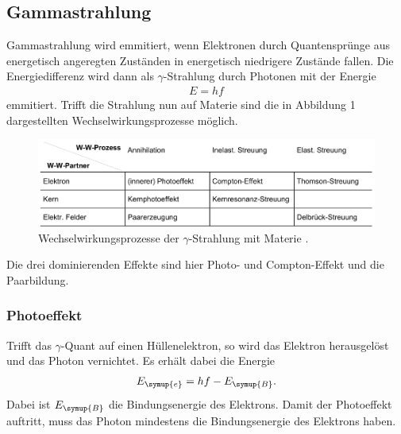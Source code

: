 \subsection{Gammastrahlung}
\label{sec:Gammastrahlung}
Gammastrahlung wird emmitiert, wenn Elektronen durch Quantensprünge aus energetisch angeregten Zuständen
in energetisch niedrigere Zustände fallen. Die Energiedifferenz wird dann als $\gamma$-Strahlung durch Photonen
mit der Energie
\begin{align*}
    E = hf
\end{align*}
emmitiert. Trifft die Strahlung nun auf Materie sind die in Abbildung 1 dargestellten
Wechselwirkungsprozesse möglich.
\begin{figure}
    \centering
    \label{fig:WWProzesse}
    \includegraphics[width=\textwidth]{Bilder/Wechselwirkung.png}
    \caption{Wechselwirkungsprozesse der $\gamma$-Strahlung mit Materie \cite{sample}.}
\end{figure}
Die drei dominierenden Effekte sind hier Photo- und Compton-Effekt und die Paarbildung.

\subsubsection{Photoeffekt}
\label{sec:Photoeffekt}
Trifft das $\gamma$-Quant auf einen Hüllenelektron, so wird das Elektron herausgelöst und das Photon vernichtet.
Es erhält dabei die Energie
\begin{align*}
    E_{\symup{e}} = hf - E_{\symup{B}}.
\end{align*}
Dabei ist $E_{\symup{B}}$ die Bindungsenergie des Elektrons. Damit der Photoeffekt auftritt, muss das Photon
mindestens die Bindungsenergie des Elektrons haben.

